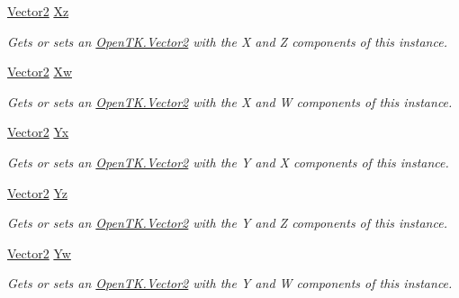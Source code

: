 \begin{DoxyCompactItemize}
\hyperlink{struct_open_t_k_1_1_vector2}{Vector2} \hyperlink{struct_open_t_k_1_1_vector4_a4e9f6d694c35bdcf4285f9bb1aca624f}{Xz}
\begin{DoxyCompactList}\small\item\em Gets or sets an \hyperlink{struct_open_t_k_1_1_vector2}{Open\-T\-K.\-Vector2} with the X and Z components of this instance. \end{DoxyCompactList}\item 
\hyperlink{struct_open_t_k_1_1_vector2}{Vector2} \hyperlink{struct_open_t_k_1_1_vector4_a6585c77b5bef07e93623c8d274ffd8ab}{Xw}
\begin{DoxyCompactList}\small\item\em Gets or sets an \hyperlink{struct_open_t_k_1_1_vector2}{Open\-T\-K.\-Vector2} with the X and W components of this instance. \end{DoxyCompactList}\item 
\hyperlink{struct_open_t_k_1_1_vector2}{Vector2} \hyperlink{struct_open_t_k_1_1_vector4_af8cfeb04cdb9a96f668edde34b69dd98}{Yx}
\begin{DoxyCompactList}\small\item\em Gets or sets an \hyperlink{struct_open_t_k_1_1_vector2}{Open\-T\-K.\-Vector2} with the Y and X components of this instance. \end{DoxyCompactList}\item 
\hyperlink{struct_open_t_k_1_1_vector2}{Vector2} \hyperlink{struct_open_t_k_1_1_vector4_a045001f835440f1e80dfc399f443e3ef}{Yz}
\begin{DoxyCompactList}\small\item\em Gets or sets an \hyperlink{struct_open_t_k_1_1_vector2}{Open\-T\-K.\-Vector2} with the Y and Z components of this instance. \end{DoxyCompactList}\item 
\hyperlink{struct_open_t_k_1_1_vector2}{Vector2} \hyperlink{struct_open_t_k_1_1_vector4_a93fb0f3aa1e997e2ac52ecd9117fb78f}{Yw}
\begin{DoxyCompactList}\small\item\em Gets or sets an \hyperlink{struct_open_t_k_1_1_vector2}{Open\-T\-K.\-Vector2} with the Y and W components of this instance. \end{DoxyCompactList}\item 

\end{DoxyCompactItemize}
